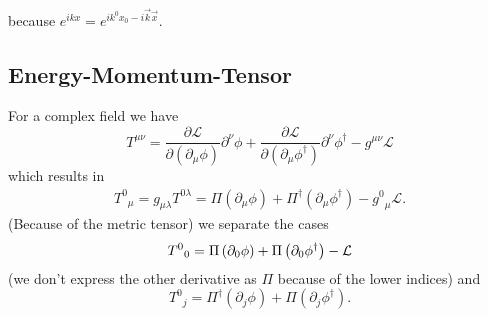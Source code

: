 because $e^{ikx} = e^{ik^0 x_0 - i \vec{k}\vec{x}}$.



\subsection*{Energy-Momentum-Tensor}
For a complex field we have
\begin{equation}
    T^{\mu \nu} = \frac{\partial{\mathcal{L}}}{\partial(\partial_{\mu}\phi)}\partial^{\nu}\phi+\frac{\partial{\mathcal{L}}}{\partial(\partial_{\mu}\phi^{\dagger})}\partial^{\nu}\phi^{\dagger}-g^{\mu\nu}{\mathcal{L}}
\end{equation}
which results in 
\begin{align}
    {T^0}_\mu = g_{\mu \lambda} T^{0 \lambda}
              =  \Pi \left( \partial_{\mu}\phi \right)  + \Pi^\dagger \left( \partial_{\mu}\phi^\dagger \right) - {g^0}_\mu \mathcal{L}.
\end{align}
(Because of the metric tensor) we separate the cases
\begin{equation}
    {T^0}_0 = \Pi \left( \partial_{0}\phi \right)  + \Pi \left( \partial_{0}\phi^\dagger \right) - \mathcal{L}\\
\end{equation}
(we don't express the other derivative as $\Pi$ because of the lower indices) and 
\begin{equation}
    {T^0}_j = \Pi^\dagger \left( \partial_{j}\phi \right)  + \Pi \left( \partial_{j}\phi^\dagger \right).
\end{equation}

